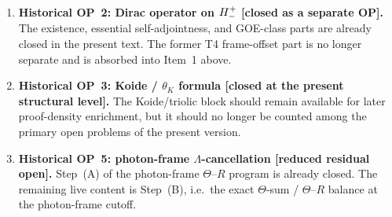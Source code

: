 \begin{enumerate}
  \item \textbf{Historical OP~2: Dirac operator on $H^+_-$ [closed as a separate OP].}
        The existence, essential self-adjointness, and GOE-class parts are
        already closed in the present text. The former T4 frame-offset part is
        no longer separate and is absorbed into Item~1 above.

  \item \textbf{Historical OP~3: Koide / $\theta_K$ formula [closed at the present structural level].}
        The Koide/triolic block should remain available for later proof-density
        enrichment, but it should no longer be counted among the primary open
        problems of the present version.

  \item \textbf{Historical OP~5: photon-frame $\Lambda$-cancellation [reduced residual open].}
        Step~(A) of the photon-frame $\Theta$--$R$ program is already closed.
        The remaining live content is Step~(B), i.e.\ the exact
        $\Theta$-sum / $\Theta$--$R$ balance at the photon-frame cutoff.
\end{enumerate}

\clearpage
